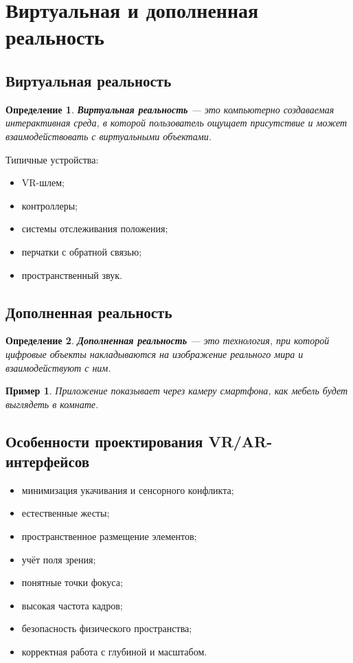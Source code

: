 \documentclass[12pt,a4paper]{article}
\newtheorem{definition}{Определение}
\newtheorem{example}{Пример}
\begin{document}
\section{Виртуальная и дополненная реальность}

\subsection{Виртуальная реальность}

\begin{definition}
\textbf{Виртуальная реальность} --- это компьютерно создаваемая интерактивная среда, в которой пользователь ощущает присутствие и может взаимодействовать с виртуальными объектами.
\end{definition}

Типичные устройства:
\begin{itemize}
    \item VR-шлем;
    \item контроллеры;
    \item системы отслеживания положения;
    \item перчатки с обратной связью;
    \item пространственный звук.
\end{itemize}

\subsection{Дополненная реальность}

\begin{definition}
\textbf{Дополненная реальность} --- это технология, при которой цифровые объекты накладываются на изображение реального мира и взаимодействуют с ним.
\end{definition}

\begin{example}
Приложение показывает через камеру смартфона, как мебель будет выглядеть в комнате.
\end{example}

\subsection{Особенности проектирования VR/AR-интерфейсов}

\begin{itemize}
    \item минимизация укачивания и сенсорного конфликта;
    \item естественные жесты;
    \item пространственное размещение элементов;
    \item учёт поля зрения;
    \item понятные точки фокуса;
    \item высокая частота кадров;
    \item безопасность физического пространства;
    \item корректная работа с глубиной и масштабом.
\end{itemize}
\end{document}
